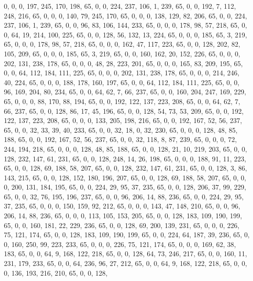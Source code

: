 \begin{DoxyCode}
       0, 0, 0, 197, 245, 170, 198, 65, 0, 0, 224, 237, 106, 1, 239, 65, 0, 0, 192, 7, 112, 248, 216, 65, 0, 0, 0,
       140, 79, 245, 170, 65, 0, 0, 0, 138, 129, 82, 206, 65, 0, 0, 224, 237, 106, 1, 239, 65, 0, 0, 96, 83, 106,
       144, 233, 65, 0, 0, 0, 178, 98, 57, 218, 65, 0, 0, 64, 19, 214, 100, 225, 65, 0, 0, 128, 56, 132, 13, 224, 65,
       0, 0, 0, 185, 65, 3, 219, 65, 0, 0, 0, 178, 98, 57, 218, 65, 0, 0, 0, 162, 47, 117, 223, 65, 0, 0, 128,
       202, 82, 105, 209, 65, 0, 0, 0, 185, 65, 3, 219, 65, 0, 0, 160, 162, 20, 152, 226, 65, 0, 0, 0, 202, 131, 238,
       178, 65, 0, 0, 0, 48, 28, 223, 201, 65, 0, 0, 0, 165, 83, 209, 195, 65, 0, 0, 64, 112, 184, 111, 225, 65, 0,
       0, 0, 202, 131, 238, 178, 65, 0, 0, 0, 214, 246, 40, 224, 65, 0, 0, 0, 188, 178, 160, 197, 65, 0, 0, 64,
       112, 184, 111, 225, 65, 0, 0, 96, 169, 204, 80, 234, 65, 0, 0, 64, 62, 7, 66, 237, 65, 0, 0, 160, 204, 247,
       169, 229, 65, 0, 0, 0, 88, 170, 88, 194, 65, 0, 0, 192, 122, 137, 223, 208, 65, 0, 0, 64, 62, 7, 66, 237, 65,
       0, 0, 128, 86, 17, 45, 196, 65, 0, 0, 128, 54, 73, 53, 209, 65, 0, 0, 192, 122, 137, 223, 208, 65, 0, 0, 0,
       133, 205, 198, 216, 65, 0, 0, 192, 167, 52, 56, 237, 65, 0, 0, 32, 33, 39, 40, 233, 65, 0, 0, 32, 18, 0, 32,
       230, 65, 0, 0, 0, 128, 48, 85, 188, 65, 0, 0, 192, 167, 52, 56, 237, 65, 0, 0, 32, 118, 8, 87, 239, 65, 0,
       0, 0, 72, 244, 194, 218, 65, 0, 0, 0, 128, 48, 85, 188, 65, 0, 0, 128, 21, 10, 219, 203, 65, 0, 0, 128, 232,
       147, 61, 231, 65, 0, 0, 128, 248, 14, 26, 198, 65, 0, 0, 0, 188, 91, 11, 223, 65, 0, 0, 128, 69, 188, 58,
       207, 65, 0, 0, 128, 232, 147, 61, 231, 65, 0, 0, 128, 3, 86, 143, 215, 65, 0, 0, 128, 152, 180, 196, 207, 65,
       0, 0, 128, 69, 188, 58, 207, 65, 0, 0, 0, 200, 131, 184, 195, 65, 0, 0, 224, 29, 95, 37, 235, 65, 0, 0,
       128, 206, 37, 99, 229, 65, 0, 0, 32, 76, 195, 196, 237, 65, 0, 0, 96, 206, 14, 88, 236, 65, 0, 0, 224, 29, 95,
       37, 235, 65, 0, 0, 0, 150, 159, 92, 212, 65, 0, 0, 0, 143, 47, 148, 210, 65, 0, 0, 96, 206, 14, 88, 236, 65,
       0, 0, 0, 113, 105, 153, 205, 65, 0, 0, 128, 183, 109, 190, 199, 65, 0, 0, 160, 181, 22, 229, 236, 65, 0, 0,
       128, 69, 200, 139, 231, 65, 0, 0, 0, 226, 75, 121, 174, 65, 0, 0, 128, 183, 109, 190, 199, 65, 0, 0, 224,
       64, 187, 39, 236, 65, 0, 0, 160, 250, 99, 223, 233, 65, 0, 0, 0, 226, 75, 121, 174, 65, 0, 0, 0, 169, 62, 38,
       183, 65, 0, 0, 64, 9, 168, 122, 218, 65, 0, 0, 128, 64, 73, 246, 217, 65, 0, 0, 160, 11, 231, 179, 233, 65,
       0, 0, 64, 236, 96, 27, 212, 65, 0, 0, 64, 9, 168, 122, 218, 65, 0, 0, 0, 136, 193, 216, 210, 65, 0, 0, 128,

\end{DoxyCode}
